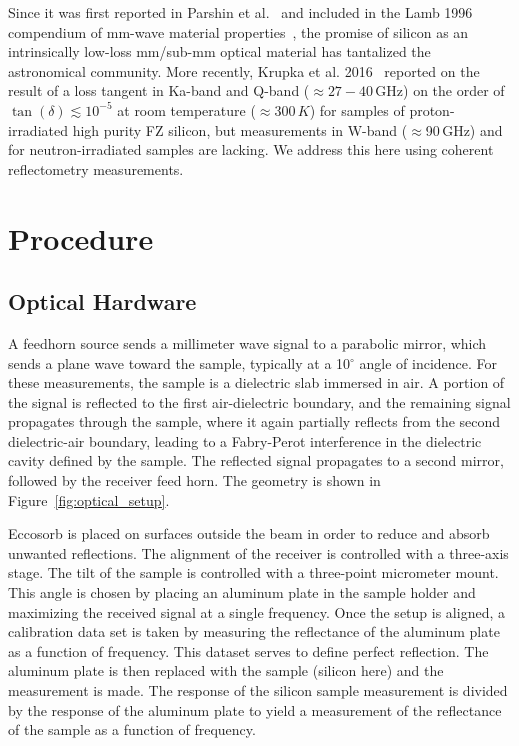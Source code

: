 Since it was first reported in Parshin et al.~\cite{parshin} and included in the Lamb 1996 compendium of mm-wave material properties~\cite{lamb}, the promise of silicon as an intrinsically low-loss mm/sub-mm optical material has tantalized the astronomical community.   More recently, Krupka et al. 2016~\cite{KRUPKA201676} reported on the result of a loss tangent in Ka-band and Q-band ($\approx27-40$\,GHz) on the order of $\tan(\delta)\lesssim 10^{-5}$ at room temperature ($\approx300\,K$) for samples of proton-irradiated high purity FZ silicon, but measurements in W-band ($\approx$90\,GHz) and for neutron-irradiated samples are lacking. We address this here using coherent reflectometry measurements.

\section{Procedure}
\subsection{Optical Hardware}
A feedhorn source sends a millimeter wave signal to a parabolic mirror, which sends a plane wave toward the sample, typically at a 10$^{\circ}$ angle of incidence. For these measurements, the sample is a dielectric slab immersed in air. A portion of the signal is reflected to the first air-dielectric boundary, and the remaining signal propagates through the sample, where it again partially reflects from the second dielectric-air boundary, leading to a Fabry-Perot interference in the dielectric cavity defined by the sample. The reflected signal propagates to a second mirror, followed by the receiver feed horn. The geometry is shown in Figure~\ref{fig:optical_setup}.

Eccosorb is placed on surfaces outside the beam in order to reduce and absorb unwanted reflections.   The alignment of the receiver is controlled with a three-axis stage. The tilt of the sample is controlled with a three-point micrometer mount.   This angle is chosen by placing an aluminum plate in the sample holder and maximizing the received signal at a single frequency. Once the setup is aligned, a calibration data set is taken by measuring the reflectance of the aluminum plate as a function of frequency. This dataset serves to define perfect reflection.   The aluminum plate is then replaced with the sample (silicon here) and the measurement is made. The response of the silicon sample measurement is divided by the response of the aluminum plate to yield a measurement of the reflectance of the sample as a function of frequency.

